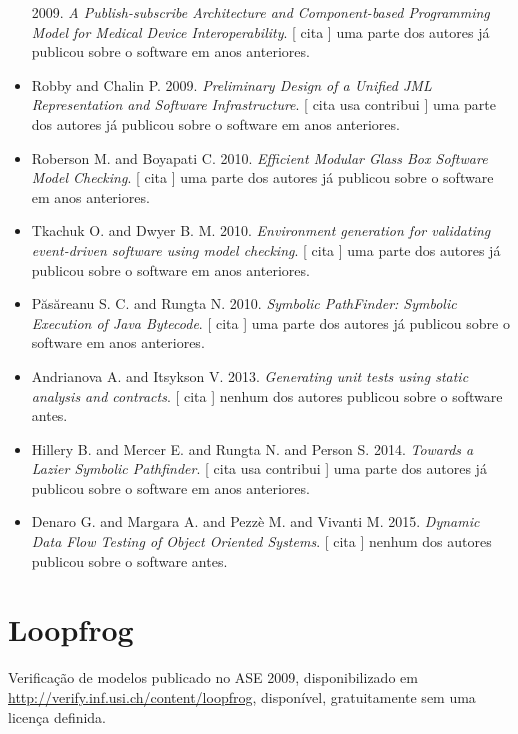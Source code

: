 \begin{itemize}
      2009.
        \textit{ A Publish-subscribe Architecture and Component-based Programming Model for Medical Device Interoperability}.
      [
          cita
      ]
uma parte dos autores já publicou sobre o software em anos anteriores.
\item Robby and Chalin P.
      2009.
        \textit{ Preliminary Design of a Unified JML Representation and Software Infrastructure}.
      [
          cita
          usa
          contribui
      ]
uma parte dos autores já publicou sobre o software em anos anteriores.
\item Roberson M. and Boyapati C.
      2010.
        \textit{ Efficient Modular Glass Box Software Model Checking}.
      [
          cita
      ]
uma parte dos autores já publicou sobre o software em anos anteriores.
\item Tkachuk O. and Dwyer B. M.
      2010.
        \textit{ Environment generation for validating event-driven software using model checking}.
      [
          cita
      ]
uma parte dos autores já publicou sobre o software em anos anteriores.
\item P\u{a}s\u{a}reanu S. C. and Rungta N.
      2010.
        \textit{ Symbolic PathFinder: Symbolic Execution of Java Bytecode}.
      [
          cita
      ]
uma parte dos autores já publicou sobre o software em anos anteriores.
\item Andrianova A. and Itsykson V.
      2013.
        \textit{ Generating unit tests using static analysis and contracts}.
      [
          cita
      ]
nenhum dos autores publicou sobre o software antes.
\item Hillery B. and Mercer E. and Rungta N. and Person S.
      2014.
        \textit{ Towards a Lazier Symbolic Pathfinder}.
      [
          cita
          usa
          contribui
      ]
uma parte dos autores já publicou sobre o software em anos anteriores.
\item Denaro G. and Margara A. and Pezzè M. and Vivanti M.
      2015.
        \textit{ Dynamic Data Flow Testing of Object Oriented Systems}.
      [
          cita
      ]
nenhum dos autores publicou sobre o software antes.
\end{itemize}
\section{Loopfrog}

Verificação de modelos
publicado no ASE 2009,
disponibilizado em \url{http://verify.inf.usi.ch/content/loopfrog},
disponível,
gratuitamente
sem uma licença definida.

